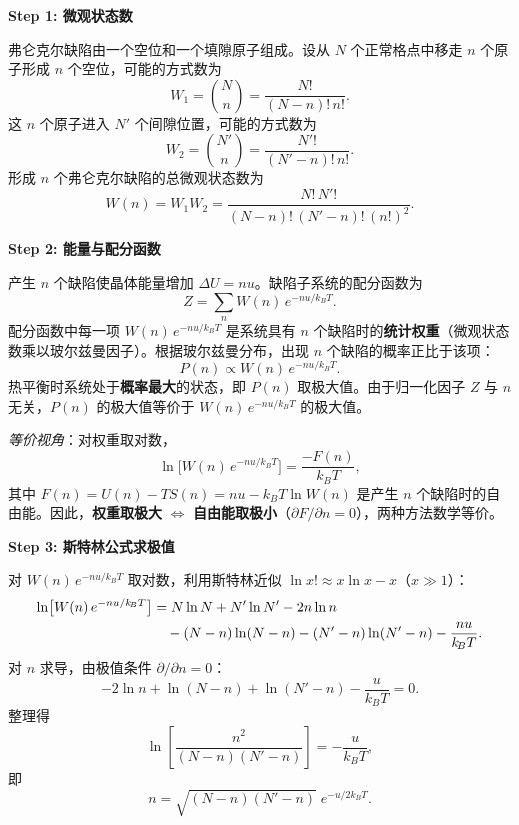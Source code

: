\begin{derivationbox}[标准解题过程]
\textbf{Step 1: 微观状态数}

弗仑克尔缺陷由一个空位和一个填隙原子组成。设从 $N$ 个正常格点中移走 $n$ 个原子形成 $n$ 个空位，可能的方式数为
\begin{equation}
W_1 = \binom{N}{n} = \frac{N!}{(N-n)!\,n!}.
\end{equation}
这 $n$ 个原子进入 $N'$ 个间隙位置，可能的方式数为
\begin{equation}
W_2 = \binom{N'}{n} = \frac{N'!}{(N'-n)!\,n!}.
\end{equation}
形成 $n$ 个弗仑克尔缺陷的总微观状态数为
\begin{equation}
W(n) = W_1 W_2 = \frac{N!\,N'!}{(N-n)!\,(N'-n)!\,(n!)^2}.
\label{eq:frenkel-W}
\end{equation}

\textbf{Step 2: 能量与配分函数}

产生 $n$ 个缺陷使晶体能量增加 $\Delta U = nu$。缺陷子系统的配分函数为
\begin{equation}
Z = \sum_n W(n)\, e^{-nu/k_{\!B}T}.
\end{equation}
配分函数中每一项 $W(n)\,e^{-nu/k_{\!B}T}$ 是系统具有 $n$ 个缺陷时的\textbf{统计权重}（微观状态数乘以玻尔兹曼因子）。根据玻尔兹曼分布，出现 $n$ 个缺陷的概率正比于该项：
\begin{equation}
P(n) \propto W(n)\,e^{-nu/k_{\!B}T}.
\end{equation}
热平衡时系统处于\textbf{概率最大}的状态，即 $P(n)$ 取极大值。由于归一化因子 $Z$ 与 $n$ 无关，$P(n)$ 的极大值等价于 $W(n)\,e^{-nu/k_{\!B}T}$ 的极大值。

\textit{等价视角}：对权重取对数，
\begin{equation}
\ln\!\bigl[W(n)\,e^{-nu/k_{\!B}T}\bigr] = \frac{-F(n)}{k_{\!B}T},
\end{equation}
其中 $F(n)=U(n)-TS(n)=nu-k_{\!B}T\ln W(n)$ 是产生 $n$ 个缺陷时的自由能。因此，\textbf{权重取极大} $\Leftrightarrow$ \textbf{自由能取极小}（$\partial F/\partial n=0$），两种方法数学等价。

\textbf{Step 3: 斯特林公式求极值}

对 $W(n)\,e^{-nu/k_{\!B}T}$ 取对数，利用斯特林近似 $\ln x! \approx x\ln x - x$（$x\gg 1$）：
\begin{align}
\ln\bigl[W(n)\,e^{-nu/k_{\!B}T}\bigr]
&= N\ln N + N'\ln N' - 2n\ln n \notag\\
&\quad - (N-n)\ln(N-n) - (N'-n)\ln(N'-n) - \frac{nu}{k_{\!B}T}.
\end{align}
对 $n$ 求导，由极值条件 $\partial/\partial n = 0$：
\begin{equation}
-2\ln n + \ln(N-n) + \ln(N'-n) - \frac{u}{k_{\!B}T} = 0.
\end{equation}
整理得
\begin{equation}
\ln\!\left[\frac{n^2}{(N-n)(N'-n)}\right] = -\frac{u}{k_{\!B}T},
\end{equation}
即
\begin{equation}
n = \sqrt{(N-n)(N'-n)}\; e^{-u/2k_{\!B}T}.
\label{eq:frenkel-exact}
\end{equation}


\end{derivationbox}
